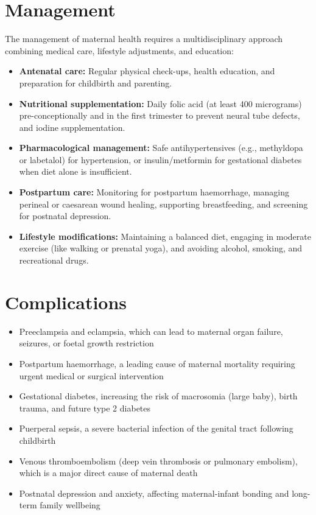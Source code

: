 \section*{Management}
The management of maternal health requires a multidisciplinary approach combining medical care, lifestyle adjustments, and education:

\begin{itemize}
    \item \textbf{Antenatal care:} Regular physical check-ups, health education, and preparation for childbirth and parenting.
    \item \textbf{Nutritional supplementation:} Daily folic acid (at least 400 micrograms) pre-conceptionally and in the first trimester to prevent neural tube defects, and iodine supplementation.
    \item \textbf{Pharmacological management:} Safe antihypertensives (e.g., methyldopa or labetalol) for hypertension, or insulin/metformin for gestational diabetes when diet alone is insufficient.
    \item \textbf{Postpartum care:} Monitoring for postpartum haemorrhage, managing perineal or caesarean wound healing, supporting breastfeeding, and screening for postnatal depression.
    \item \textbf{Lifestyle modifications:} Maintaining a balanced diet, engaging in moderate exercise (like walking or prenatal yoga), and avoiding alcohol, smoking, and recreational drugs.
\end{itemize}

\section*{Complications}
\begin{itemize}
    \item Preeclampsia and eclampsia, which can lead to maternal organ failure, seizures, or foetal growth restriction
    \item Postpartum haemorrhage, a leading cause of maternal mortality requiring urgent medical or surgical intervention
    \item Gestational diabetes, increasing the risk of macrosomia (large baby), birth trauma, and future type 2 diabetes
    \item Puerperal sepsis, a severe bacterial infection of the genital tract following childbirth
    \item Venous thromboembolism (deep vein thrombosis or pulmonary embolism), which is a major direct cause of maternal death
    \item Postnatal depression and anxiety, affecting maternal-infant bonding and long-term family wellbeing
\end{itemize}

